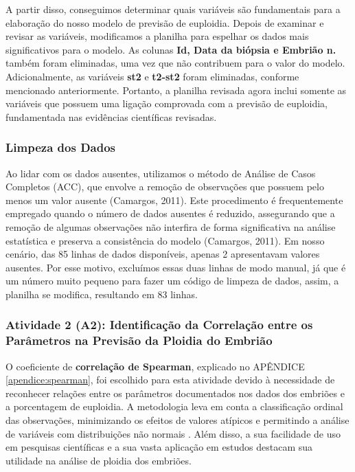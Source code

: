 A partir disso, conseguimos determinar quais variáveis são fundamentais para a elaboração do nosso modelo de previsão de euploidia. Depois de examinar e revisar as variáveis, modificamos a planilha para espelhar os dados mais significativos para o modelo. As colunas \textbf{Id, Data da biópsia e Embrião n.} também foram eliminadas, uma vez que não contribuem para o valor do modelo. Adicionalmente, as variáveis \textbf{st2} e \textbf{t2-st2} foram eliminadas, conforme mencionado anteriormente. Portanto, a planilha revisada agora inclui somente as variáveis que possuem uma ligação comprovada com a previsão de euploidia, fundamentada nas evidências científicas revisadas.

\subsubsection{Limpeza dos Dados}
Ao lidar com os dados ausentes, utilizamos o método de Análise de Casos Completos (ACC), que envolve a remoção de observações que possuem pelo menos um valor ausente (Camargos, 2011). Este procedimento é frequentemente empregado quando o número de dados ausentes é reduzido, assegurando que a remoção de algumas observações não interfira de forma significativa na análise estatística e preserva a consistência do modelo (Camargos, 2011). Em nosso cenário, das 85 linhas de dados disponíveis, apenas 2 apresentavam valores ausentes. Por esse motivo, excluímos essas duas linhas de modo manual, já que é um número muito pequeno para fazer um código de limpeza de dados, assim, a planilha se modifica, resultando em 83 linhas.

\subsubsection{Atividade 2 (A2): Identificação da Correlação entre os Parâmetros na Previsão da Ploidia do Embrião}

O coeficiente de \textbf{correlação de Spearman}, explicado no APÊNDICE \ref{apendice:spearman}, foi escolhido para esta atividade devido à necessidade de reconhecer relações entre os parâmetros documentados nos dados dos embriões e a porcentagem de euploidia. A metodologia leva em conta a classificação ordinal das observações, minimizando os efeitos de valores atípicos e permitindo a análise de variáveis com distribuições não normais \cite{sousa2019}. Além disso, a sua facilidade de uso em pesquisas científicas e a sua vasta aplicação em estudos destacam sua utilidade na análise de ploidia dos embriões.

